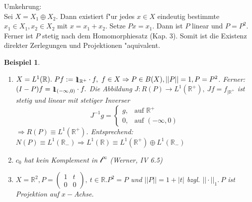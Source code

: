 \documentclass[a4paper,11pt]{book}
\newcommand{\R}{{\mathbb R}}
\newcommand{\ssl}{{\mathcal l}}
\newcommand{\id}{1\hspace{-0,9ex}\raisebox{-0,2ex}{1}}
\newtheorem{Bsp}[Def]{Beispiel}
\theoremstyle{nonumberplain}
\begin{document}
Umkehrung:\\
Sei $X = X_1 \oplus X_2$. Dann existiert f"ur jedes $x \in X$ eindeutig bestimmte $x_1 \in X_1, x_2 \in X_2$ mit $x = x_1 + x_2$. Setze $Px = x_1$. Dann ist $P$ linear und $P=P^2$. Ferner ist $P$ stetig nach dem Homomorphiesatz (Kap. 3). Somit ist die Existenz direkter Zerlegungen und Projektionen "aquivalent.

\begin{Bsp}
\begin{enumerate}

\item[a)] $X = L^1(\R).\ Pf := \id_{\R^+} \cdot f,\ f \in X \Rightarrow P \in B(X), ||P|| = 1, P = P^2$. Ferner: $(I-P)f = \id_{(-\infty,0)} \cdot f.$ Die Abbildung $J: R(P) \rightarrow L^1(\R^+),\ Jf = f_{|\R^+}$ ist stetig und linear mit stetiger Inverser
\[
J^{-1}g = \left\{
\begin{array}{rl}
g ,& \text{auf } \R^+ \\
0 ,& \text{auf } (-\infty,0)
\end{array} \right.
\]
$\Rightarrow R(P) \equiv L^1(\R^+)$. Entsprechend: $N(P) \equiv L^1(\R_-) \Rightarrow L^1(\R) \equiv L^1(\R^+) \oplus L^1(\R_-)$

\item[b)] $c_0$ hat kein Komplement in $\ssl^{\infty}$ (Werner, IV 6.5)

\item[c)] $X = \R^2, P = \begin{pmatrix} 1 & t \\ 0 & 0 \end{pmatrix},\ t \in \R. P^2 = P$ und $||P|| = 1 + |t|$ bzgl. $||\cdot||_1.\ P$ ist Projektion auf $x-$Achse.
\end{enumerate}
\end{Bsp}
\end{document}
